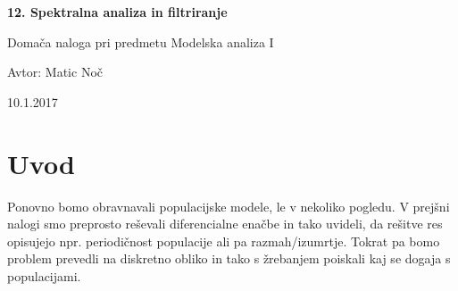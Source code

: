 \documentclass[11pt, a4paper]{article}
\begin{document}
    \begin{center}
    {\LARGE\bfseries 12. Spektralna analiza in filtriranje \par}
    \vspace{1cm}
    
    {\Large Domača naloga pri predmetu Modelska analiza I\par}
    \vspace{0.2cm}
    {\normalsize Avtor: Matic Noč \par}
    \vspace{0.2cm}    
    {\normalsize 10.1.2017 \par}    

    
    \end{center}
\section{Uvod}
Ponovno bomo obravnavali populacijske modele, le v nekoliko pogledu. V prejšni nalogi smo preprosto reševali diferencialne enačbe in tako uvideli, da rešitve res opisujejo npr. periodičnost populacije ali pa razmah/izumrtje. Tokrat pa bomo problem prevedli na diskretno obliko in tako s žrebanjem poiskali kaj se dogaja s populacijami.
\end{document}
